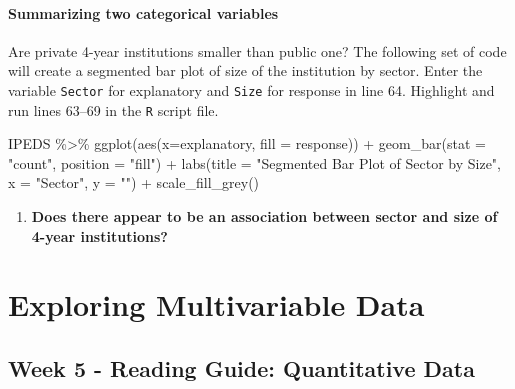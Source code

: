\documentclass[
]{report}
\newenvironment{Shaded}{\begin{snugshade}}{\end{snugshade}}
\newcommand{\AttributeTok}[1]{\textcolor[rgb]{0.77,0.63,0.00}{#1}}
\newcommand{\FunctionTok}[1]{\textcolor[rgb]{0.00,0.00,0.00}{#1}}
\newcommand{\NormalTok}[1]{#1}
\newcommand{\SpecialCharTok}[1]{\textcolor[rgb]{0.00,0.00,0.00}{#1}}
\newcommand{\StringTok}[1]{\textcolor[rgb]{0.31,0.60,0.02}{#1}}
\providecommand{\tightlist}{%
  \setlength{\itemsep}{0pt}\setlength{\parskip}{0pt}}
\begin{document}
\hypertarget{summarizing-two-categorical-variables}{%
\subsubsection{Summarizing two categorical variables}\label{summarizing-two-categorical-variables}}

Are private 4-year institutions smaller than public one? The following set of code will create a segmented bar plot of size of the institution by sector. Enter the variable \texttt{Sector} for explanatory and \texttt{Size} for response in line 64. Highlight and run lines 63--69 in the \texttt{R} script file.

\begin{Shaded}
\begin{Highlighting}[]
\NormalTok{IPEDS }\SpecialCharTok{\%\textgreater{}\%}
  \FunctionTok{ggplot}\NormalTok{(}\FunctionTok{aes}\NormalTok{(}\AttributeTok{x=}\NormalTok{explanatory, }\AttributeTok{fill =}\NormalTok{ response)) }\SpecialCharTok{+}
  \FunctionTok{geom\_bar}\NormalTok{(}\AttributeTok{stat =} \StringTok{"count"}\NormalTok{, }\AttributeTok{position =} \StringTok{"fill"}\NormalTok{) }\SpecialCharTok{+} 
  \FunctionTok{labs}\NormalTok{(}\AttributeTok{title =} \StringTok{"Segmented Bar Plot of Sector by Size"}\NormalTok{,}
       \AttributeTok{x =} \StringTok{"Sector"}\NormalTok{,}
       \AttributeTok{y =} \StringTok{""}\NormalTok{) }\SpecialCharTok{+}
  \FunctionTok{scale\_fill\_grey}\NormalTok{()}
\end{Highlighting}
\end{Shaded}

\begin{enumerate}
\def\labelenumi{\arabic{enumi}.}
\setcounter{enumi}{18}
\tightlist
\item
  \textbf{Does there appear to be an association between sector and size of 4-year institutions?}
  \vspace{0.5in}
\end{enumerate}

\newpage

\hypertarget{exploring-multivariable-data}{%
\chapter{Exploring Multivariable Data}\label{exploring-multivariable-data}}

\hypertarget{week-5---reading-guide-quantitative-data}{%
\section{Week 5 - Reading Guide: Quantitative Data}\label{week-5---reading-guide-quantitative-data}}
\end{document}
